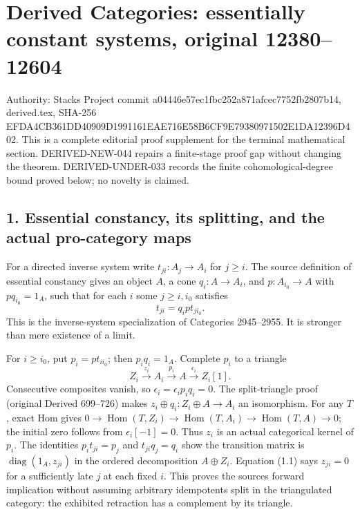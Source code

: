 \section{\texorpdfstring{Derived Categories:\allowbreak{} essentially constant systems,\allowbreak{} original 12380–\allowbreak{}12604}{Derived  essentially constant  original }}\label{proofs-12380-12604-derived-categories-essentially-constant-systems-original-1238012604}

Authority:\allowbreak{} Stacks Project commit a04446e5\allowbreak{}7ec1fbc2\allowbreak{}52a871af\allowbreak{}cec7752f\allowbreak{}b2807b14, derived.tex,\allowbreak{} SHA-256 EFDA4CB3\allowbreak{}61DD4090\allowbreak{}9D199116\allowbreak{}1EAE716E\allowbreak{}58B6CF9E\allowbreak{}79380971\allowbreak{}502E1DA1\allowbreak{}2396D402. This is a complete editorial proof supplement for the terminal mathematical section. DERIVED-NEW-044 repairs a finite-stage proof gap without changing the theorem. DERIVED-UNDER-033 records the finite cohomological-degree bound proved below; no novelty is claimed.

\subsection{\texorpdfstring{1. Essential constancy,\allowbreak{} its splitting,\allowbreak{} and the actual pro-category maps}{1. Essential  its  and the actual pro-category maps}}\label{proofs-12380-12604-essential-constancy-its-splitting-and-the-actual-pro-category-maps}

For a directed inverse system write \(t_{ji}:A_j\to A_i\) for \(j\geq i\). The source definition of essential constancy gives an object \(A\),\allowbreak{} a cone \(q_i:A\to A_i\),\allowbreak{} and \(p:A_{i_0}\to A\) with \(pq_{i_0}=1_A\),\allowbreak{} such that for each \(i\) some \(j\geq i,i_0\) satisfies \[
t_{ji}=q_i p t_{j i_0}. \tag{1.1}
\] This is the inverse-system specialization of Categories 2945–\allowbreak{}2955. It is stronger than mere existence of a limit.

For \(i\geq i_0\),\allowbreak{} put \(p_i=p t_{i i_0}\); then \(p_iq_i=1_A\). Complete \(p_i\) to a triangle \[
Z_i\xrightarrow{z_i}A_i\xrightarrow{p_i}A\xrightarrow{\epsilon_i}Z_i[1].
\] Consecutive composites vanish,\allowbreak{} so \(\epsilon_i=\epsilon_ip_iq_i=0\). The split-triangle proof (original Derived 699–\allowbreak{}726)\allowbreak{} makes \(z_i\oplus q_i:Z_i\oplus A\to A_i\) an isomorphism. For any \(T\),\allowbreak{} exact Hom gives \(0\to\operatorname{Hom}(T,Z_i)\to\operatorname{Hom}(T,A_i)
 \to\operatorname{Hom}(T,A)\to0\); the initial zero follows from \(\epsilon_i[-1]=0\). Thus \(z_i\) is an actual categorical kernel of \(p_i\). The identities \(p_i t_{ji}=p_j\) and \(t_{ji}q_j=q_i\) show the transition matrix is \(\operatorname{diag}(1_A,z_{ji})\) in the ordered decomposition \(A\oplus Z_i\). Equation (1.1)\allowbreak{} says \(z_{ji}=0\) for a sufficiently late \(j\) at each fixed \(i\). This proves the source\textquotesingle s forward implication without assuming arbitrary idempotents split in the triangulated category:\allowbreak{} the exhibited retraction has a complement by its triangle.

